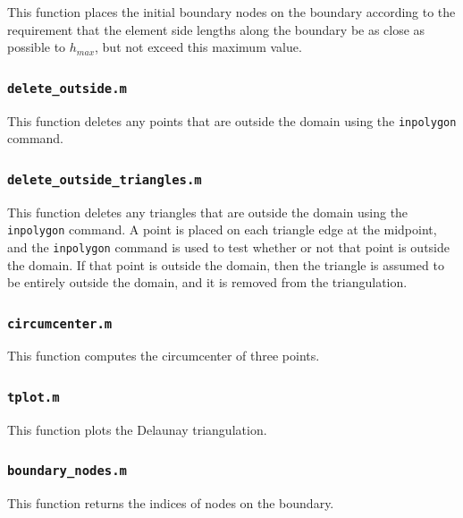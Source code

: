 \documentclass[10pt]{article}
\begin{document}
This function places the initial boundary nodes on the boundary according to the requirement that the element side lengths along the boundary be as close as possible to \(h_{max}\), but not exceed this maximum value.



\subsubsection{{\tt delete\_outside.m}}

This function deletes any points that are outside the domain using the {\tt inpolygon} command.



\subsubsection{{\tt delete\_outside\_triangles.m}}

This function deletes any triangles that are outside the domain using the {\tt inpolygon} command. A point is placed on each triangle edge at the midpoint, and the {\tt inpolygon} command is used to test whether or not that point is outside the domain. If that point is outside the domain, then the triangle is assumed to be entirely outside the domain, and it is removed from the triangulation.



\subsubsection{{\tt circumcenter.m}}

This function computes the circumcenter of three points. 



\subsubsection{{\tt tplot.m}}

This function plots the Delaunay triangulation.



\subsubsection{{\tt boundary\_nodes.m}}

This function returns the indices of nodes on the boundary.


\end{document}
